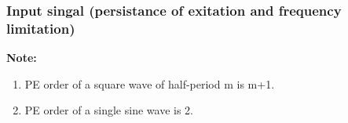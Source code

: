 
\subsubsection{Input singal (persistance of exitation and frequency limitation)}
\textbf{Note:}
\begin{enumerate}
   \item PE order of a square wave of half-period m is m+1.
   \item PE order of a single sine wave is 2.
\end{enumerate}
%
